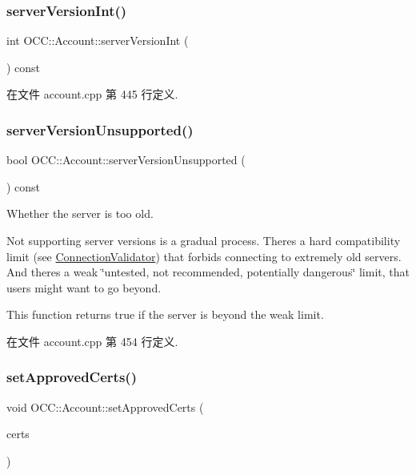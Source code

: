 \subsubsection{\texorpdfstring{server\+Version\+Int()}{serverVersionInt()}}
{\footnotesize\ttfamily int O\+C\+C\+::\+Account\+::server\+Version\+Int (\begin{DoxyParamCaption}{ }\end{DoxyParamCaption}) const}



在文件 account.\+cpp 第 445 行定义.

\mbox{\label{class_o_c_c_1_1_account_aed1104158445e18c4fb5f8ee132ffd3d}} 
\subsubsection{\texorpdfstring{server\+Version\+Unsupported()}{serverVersionUnsupported()}}
{\footnotesize\ttfamily bool O\+C\+C\+::\+Account\+::server\+Version\+Unsupported (\begin{DoxyParamCaption}{ }\end{DoxyParamCaption}) const}

Whether the server is too old.

Not supporting server versions is a gradual process. There\textquotesingle{}s a hard compatibility limit (see \hyperlink{class_o_c_c_1_1_connection_validator}{Connection\+Validator}) that forbids connecting to extremely old servers. And there\textquotesingle{}s a weak \char`\"{}untested, not
recommended, potentially dangerous\char`\"{} limit, that users might want to go beyond.

This function returns true if the server is beyond the weak limit. 

在文件 account.\+cpp 第 454 行定义.

\mbox{\label{class_o_c_c_1_1_account_aa83e4e04f4c111ad1f4f705dcb091463}} 
\subsubsection{\texorpdfstring{set\+Approved\+Certs()}{setApprovedCerts()}}
{\footnotesize\ttfamily void O\+C\+C\+::\+Account\+::set\+Approved\+Certs (\begin{DoxyParamCaption}\item[{const Q\+List$<$ Q\+Ssl\+Certificate $>$}]{certs }\end{DoxyParamCaption})}



